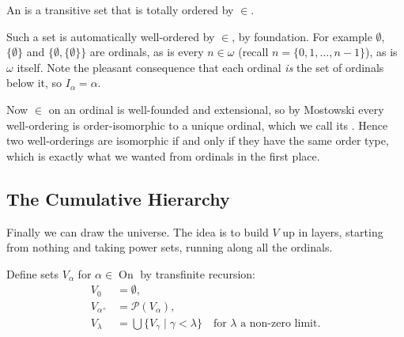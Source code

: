 \documentclass[a4paper]{scrartcl}
\newcommand{\on}{\operatorname{On}}
\begin{document}
\begin{definition}[Ordinal, in ZF]
  An  is a transitive set that is totally ordered by $\in$.
\end{definition}

Such a set is automatically well-ordered by $\in$, by foundation. For example $\emptyset$, $\{\emptyset\}$ and $\{\emptyset, \{\emptyset\}\}$ are ordinals, as is every $n \in \omega$ (recall $n = \{0, 1, \dots, n-1\}$), as is $\omega$ itself. Note the pleasant consequence that each ordinal \emph{is} the set of ordinals below it, so $I_\alpha = \alpha$.

Now $\in$ on an ordinal is well-founded and extensional, so by Mostowski every well-ordering is order-isomorphic to a unique ordinal, which we call its . Hence two well-orderings are isomorphic if and only if they have the same order type, which is exactly what we wanted from ordinals in the first place.

\subsection{The Cumulative Hierarchy}

Finally we can draw the universe. The idea is to build $V$ up in layers, starting from nothing and taking power sets, running along all the ordinals.

\begin{definition}
  Define sets $V_\alpha$ for $\alpha \in \on$ by transfinite recursion:
  \begin{align*}
    V_0 &= \emptyset, \\
    V_{\alpha^+} &= \mathcal{P}(V_\alpha), \\
    V_\lambda &= \bigcup \{V_\gamma \mid \gamma < \lambda\} \quad \text{for } \lambda \text{ a non-zero limit.}
  \end{align*}
\end{definition}

\begin{center}
\end{center}
\end{document}
